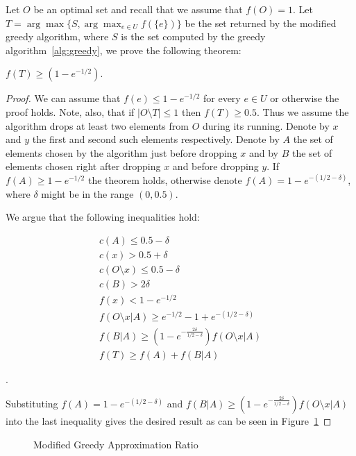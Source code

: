 Let $O$ be an optimal set and recall that we assume that $f(O) = 1$.
Let $T = \arg\max\{S, \displaystyle{\arg\max_{e \in U}}f(\{e\})\}$ 
be the set returned by the modified greedy algorithm, 
where $S$ is the set computed by the greedy algorithm~\ref{alg:greedy},
we prove the following theorem:

\begin{theorem}
$f(T) \geq (1 - e^{-1/2})$.
\end{theorem}

\begin{proof}
We can assume that $f(e) \leq 1 - e^{-1/2}$ for every $e \in U$ or otherwise the proof holds. 
Note, also, that if $|O \setminus T| \leq 1$ then $f(T) \geq 0.5$. 
Thus we assume the algorithm drops at least two elements from $O$ during its running. 
Denote by $x$ and $y$ the first and second such elements respectively.
Denote by $A$ the set of elements chosen by the algorithm just before dropping $x$ and by
$B$ the set of elements chosen right after dropping $x$ and before dropping $y$.
If $f(A) \geq 1 - e^{-1/2}$ the theorem holds, otherwise denote $f(A) = 1 - e^{-(1/2 - \delta)}$,
where $\delta$ might be in the range $(0, 0.5)$.  

We argue that the following inequalities hold:

\begin{align}
c(A) \leq 0.5 - \delta 
\\
c(x) > 0.5 + \delta
\\
c(O \setminus x) \leq 0.5 - \delta
\\
c(B) > 2\delta
\\
f(x) < 1 - e^{-1/2}
\\
\label{ineq:T}
f(O \setminus x | A) \geq e^{-1/2} - 1 + e^{-(1/2 - \delta)}
\\
\label{ineq:B}
f(B|A) \geq (1 - e^{-\frac{2\delta}{1/2 - \delta}})f(O \setminus x | A)
\\
f(T) \geq f(A) + f(B|A)
\end{align}

.

Substituting $f(A) = 1 - e^{-(1/2 - \delta)}$ 
and $f(B|A) \geq (1 - e^{-\frac{2\delta}{1/2 - \delta}})f(O \setminus x | A)$
into the last inequality gives the desired result as can be seen in Figure~\ref{fig:mgreedy}
\end{proof}

\begin{figure}
\caption{
\label{fig:mgreedy}
Modified Greedy Approximation Ratio
}
\end{figure}

